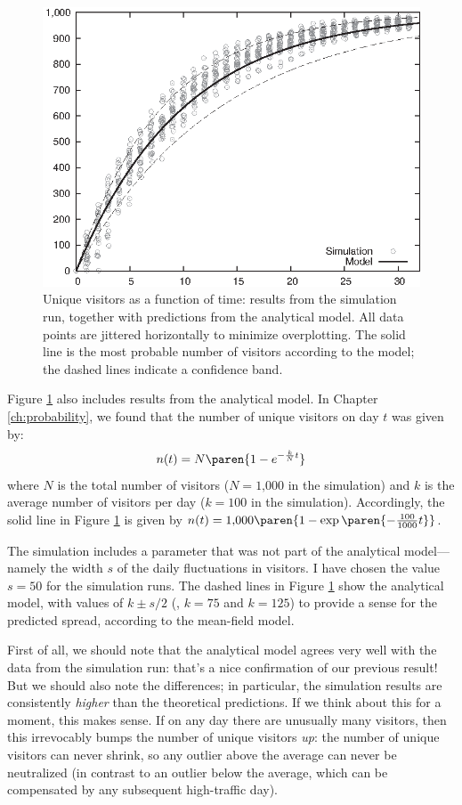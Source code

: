\begin{figure}
  \centerline{\includegraphics{img/visitssimul}}
  \caption{Unique visitors as a function of time: results from the
    simulation run, together with predictions from the analytical
    model. All data points are jittered horizontally to minimize
    overplotting. The solid line is the most probable number of
    visitors according to the model; the dashed lines indicate a
    confidence band.}
  \label{fig:visitorssimul}
\end{figure}

Figure \ref{fig:visitorssimul} also includes results from the
analytical model. In Chapter \ref{ch:probability}, we found that the
number of unique visitors on day $t$ was given by:
%
\[
n(t) = N \paren{ 1 - e^{-\frac{k}{N} t}} 
\]
%
where $N$ is the total number of visitors ($N = \text{1,000}$ in the
simulation) and $k$ is the average number of visitors per day ($k =
100$ in the simulation). Accordingly, the solid line in Figure
\ref{fig:visitorssimul} is given by $n(t) = \text{1,000} \paren{ 1 -
  \exp \paren{-\frac{100}{1000} t} }$.

The simulation includes a parameter that was not part of the
analytical model---namely the width $s$ of the daily fluctuations in
visitors. I have chosen the value $s = 50$ for the simulation runs.
The dashed lines in Figure \ref{fig:visitorssimul} show the analytical
model, with values of $k \pm s/2$ (\ie, $k=75$ and $k=125$) to provide
a sense for the predicted spread, according to the mean-field model.

First of all, we should note that the analytical model agrees very
well with the data from the simulation run: that's a nice confirmation\vadjust{\pagebreak}
of our previous result! But we should also note the differences; in
particular, the simulation results are consistently \emph{higher} than
the theoretical predictions. If we think about this for a moment, this
makes sense. If on any day there are unusually many visitors, then
this irrevocably bumps the number of unique visitors \emph{up}: the
number of unique visitors can never shrink, so any outlier above the
average can never be neutralized (in contrast to an outlier below the
average, which can be compensated by any subsequent high-traffic day).

